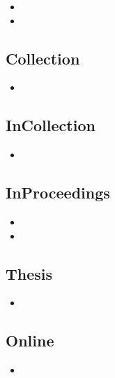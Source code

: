 \begin{itemize}
\item {}
\item {}
\end{itemize}

\subsection{Collection}

\begin{itemize}
\item {}
\end{itemize}

\subsection{InCollection}

\begin{itemize}
\item {}
\end{itemize}

\subsection{InProceedings}

\begin{itemize}
\item {}
\item {}
\end{itemize}

\subsection{Thesis}

\begin{itemize}
\item {}
\end{itemize}

\subsection{Online}

\begin{itemize}
\item {}
\end{itemize}

